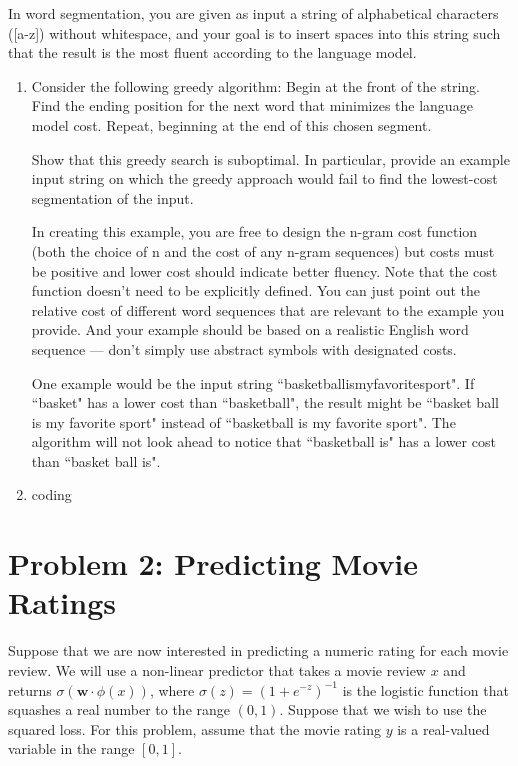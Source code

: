 \documentclass[10pt]{article}
\begin{document}
In word segmentation, you are given as input a string of alphabetical characters ([a-z]) without whitespace, and your goal is to insert spaces into this string such that the result is the most fluent according to the language model.

\begin{enumerate}[label=(\alph*)]

  \item  Consider the following greedy algorithm: Begin at the front of the string. Find the ending position for the next word that minimizes the language model cost. Repeat, beginning at the end of this chosen segment.

Show that this greedy search is suboptimal. In particular, provide an example input string on which the greedy approach would fail to find the lowest-cost segmentation of the input.

In creating this example, you are free to design the n-gram cost function (both the choice of n and the cost of any n-gram sequences) but costs must be positive and lower cost should indicate better fluency. Note that the cost function doesn't need to be explicitly defined. You can just point out the relative cost of different word sequences that are relevant to the example you provide. And your example should be based on a realistic English word sequence — don't simply use abstract symbols with designated costs. 

	One example would be the input string ``basketballismyfavoritesport". If ``basket" has a lower cost than ``basketball", the result might be ``basket ball is my favorite sport" instead of ``basketball is my favorite sport". The algorithm will not look ahead to notice that ``basketball is" has a lower cost than ``basket ball is".
  
  \item coding

\end{enumerate}

\iffalse
\section*{\normalsize Problem 2: Predicting Movie Ratings}

Suppose that we are now interested in predicting a numeric rating for each movie review. We will use a non-linear predictor that takes a movie review $x$ and returns $\sigma(\mathbf{w} \cdot \phi(x))$, where $\sigma(z)=(1+e^{-z})^{-1}$ is the logistic function that squashes a real number to the range $(0,1)$. Suppose that we wish to use the squared loss. For this problem, assume that the movie rating $y$ is a real-valued variable in the range $[0,1]$.
\end{document}
